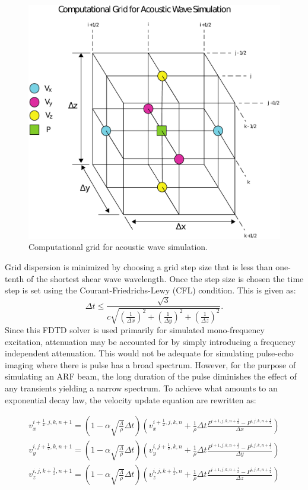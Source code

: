 \begin{figure}[htb!]
    \centering
    \includegraphics[width=0.75\linewidth]{steve/figs/image6.png}
    \caption{Computational grid for acoustic wave simulation.} 
\label{fig:steve-staggered-grid}
\end{figure}

Grid dispersion is minimized by choosing a grid step size that is less than
one-tenth of the shortest shear wave wavelength. Once the step size is chosen
the time step is set using the Courant-Friedrichs-Lewy (CFL) condition. This is
given as:
\begin{equation*}
    \Delta t \leq \frac{\sqrt{3}}{c \sqrt{\left( \frac{1}{\Delta x}\right)^2 +
    \left( \frac{1}{\Delta y}\right)^2 + \left( \frac{1}{\Delta z}\right)^2}}.
\end{equation*}
Since this FDTD solver is used primarily for simulated mono-frequency
excitation, attenuation may be accounted for by simply introducing a frequency
independent attenuation. This would not be adequate for simulating pulse-echo
imaging where there is pulse has a broad spectrum. However, for the purpose of
simulating an ARF beam, the long duration of the pulse diminishes the effect of
any transients yielding a narrow spectrum. To achieve what amounts to an
exponential decay law, the velocity update equation are rewritten as:

\begin{gather*}
    v_x^{i+\frac{1}{2},j,k,n+1} = 
    \left( 1 - \alpha \sqrt{\frac{\Lambda}{\rho}} \Delta t \right) 
    \left( v_x^{i+\frac{1}{2},j,k,n} + 
    \frac{1}{\rho} \Delta t \frac{P^{i+1,j,k,n+\frac{1}{2}}-P^{i,j,k,n+\frac{1}{2}}}{\Delta x} \right)\\
    v_y^{i,j+\frac{1}{2},k,n+1} = 
    \left( 1 - \alpha \sqrt{\frac{\Lambda}{\rho}} \Delta t \right) 
    \left( v_y^{i,j+\frac{1}{2},k,n} + 
    \frac{1}{\rho} \Delta t \frac{P^{i+1,j,k,n+\frac{1}{2}}-P^{i,j,k,n+\frac{1}{2}}}{\Delta y} \right)\\
    v_z^{i,j,k+\frac{1}{2},n+1} = 
    \left( 1 - \alpha \sqrt{\frac{\Lambda}{\rho}} \Delta t \right) 
    \left( v_z^{i,j,k+\frac{1}{2},n} + 
    \frac{1}{\rho} \Delta t \frac{P^{i+1,j,k,n+\frac{1}{2}}-P^{i,j,k,n+\frac{1}{2}}}{\Delta z} \right)\\
\end{gather*}

